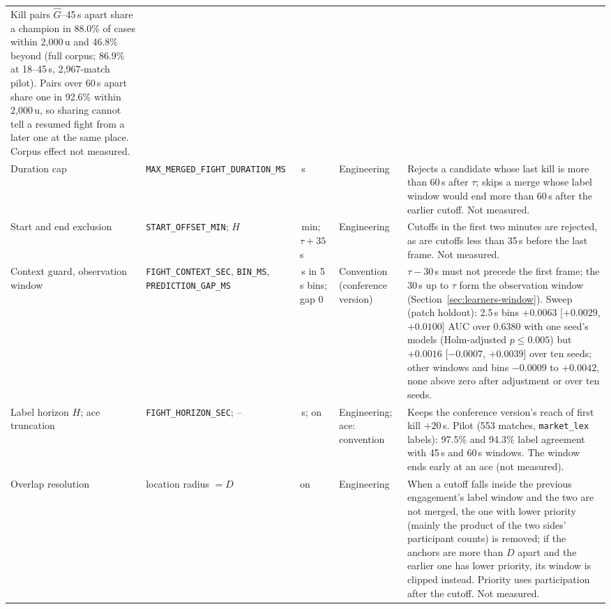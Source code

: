 \begin{table}[!t]
\begin{tabularx}{\textwidth}{@{}>{\raggedright\arraybackslash}p{2.25cm}>{\raggedright\arraybackslash}p{3.05cm}>{\raggedright\arraybackslash}p{1.75cm}>{\raggedright\arraybackslash}p{1.9cm}X@{}}
Kill pairs $\hat G$--45\,s apart share a champion in 88.0\% of cases within 2,000\,u and 46.8\% beyond (full corpus; 86.9\% at 18--45\,s, 2,967-match pilot). Pairs over 60\,s apart share one in 92.6\% within 2,000\,u, so sharing cannot tell a resumed fight from a later one at the same place. Corpus effect not measured. \\
Duration cap & \texttt{\scriptsize MAX\_\allowbreak MERGED\_\allowbreak FIGHT\_\allowbreak DURATION\_\allowbreak MS} & 60\,s & Engineering &
Rejects a candidate whose last kill is more than 60\,s after $\tau$; skips a merge whose label window would end more than 60\,s after the earlier cutoff. Not measured. \\
Start and end exclusion & \texttt{\scriptsize START\_\allowbreak OFFSET\_\allowbreak MIN}; $H$ & 2\,min; $\tau + 35$\,s & Engineering &
Cutoffs in the first two minutes are rejected, as are cutoffs less than 35\,s before the last frame. Not measured. \\
Context guard, observation window & \texttt{\scriptsize FIGHT\_\allowbreak CONTEXT\_\allowbreak SEC}, \texttt{\scriptsize BIN\_\allowbreak MS}, \texttt{\scriptsize PREDICTION\_\allowbreak GAP\_\allowbreak MS} & 30\,s in 5\,s bins; gap 0 & Convention (conference version) &
$\tau - 30$\,s must not precede the first frame; the 30\,s up to $\tau$ form the observation window (Section~\ref{sec:learners-window}). Sweep (patch holdout): 2.5\,s bins $+0.0063$ [$+0.0029$, $+0.0100$] AUC over 0.6380 with one seed's models (Holm-adjusted $p \leq 0.005$) but $+0.0016$ [$-0.0007$, $+0.0039$] over ten seeds; other windows and bins $-0.0009$ to $+0.0042$, none above zero after adjustment or over ten seeds. \\
Label horizon $H$; ace truncation & \texttt{\scriptsize FIGHT\_\allowbreak HORIZON\_\allowbreak SEC}; -- & 35\,s; on & Engineering; ace: convention &
Keeps the conference version's reach of first kill $+20$\,s. Pilot (553 matches, \texttt{market\_lex} labels): 97.5\% and 94.3\% label agreement with 45\,s and 60\,s windows. The window ends early at an ace (not measured). \\
Overlap resolution & location radius $= D$ & on & Engineering &
When a cutoff falls inside the previous engagement's label window and the two are not merged, the one with lower priority (mainly the product of the two sides' participant counts) is removed; if the anchors are more than $D$ apart and the earlier one has lower priority, its window is clipped instead. Priority uses participation after the cutoff. Not measured. \\

\end{tabularx}
\end{table}
